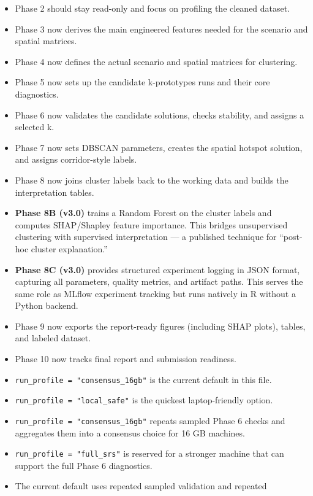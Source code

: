 \documentclass[
]{article}
\providecommand{\tightlist}{%
  \setlength{\itemsep}{0pt}\setlength{\parskip}{0pt}}
\begin{document}
\begin{itemize}
\tightlist
\item
  Phase 2 should stay read-only and focus on profiling the cleaned
  dataset.
\item
  Phase 3 now derives the main engineered features needed for the
  scenario and spatial matrices.
\item
  Phase 4 now defines the actual scenario and spatial matrices for
  clustering.
\item
  Phase 5 now sets up the candidate k-prototypes runs and their core
  diagnostics.
\item
  Phase 6 now validates the candidate solutions, checks stability, and
  assigns a selected k.
\item
  Phase 7 now sets DBSCAN parameters, creates the spatial hotspot
  solution, and assigns corridor-style labels.
\item
  Phase 8 now joins cluster labels back to the working data and builds
  the interpretation tables.
\item
  \textbf{Phase 8B (v3.0)} trains a Random Forest on the cluster labels
  and computes SHAP/Shapley feature importance. This bridges
  unsupervised clustering with supervised interpretation --- a published
  technique for ``post-hoc cluster explanation.''
\item
  \textbf{Phase 8C (v3.0)} provides structured experiment logging in
  JSON format, capturing all parameters, quality metrics, and artifact
  paths. This serves the same role as MLflow experiment tracking but
  runs natively in R without a Python backend.
\item
  Phase 9 now exports the report-ready figures (including SHAP plots),
  tables, and labeled dataset.
\item
  Phase 10 now tracks final report and submission readiness.
\item
  \texttt{run\_profile\ =\ "consensus\_16gb"} is the current default in
  this file.
\item
  \texttt{run\_profile\ =\ "local\_safe"} is the quickest
  laptop-friendly option.
\item
  \texttt{run\_profile\ =\ "consensus\_16gb"} repeats sampled Phase 6
  checks and aggregates them into a consensus choice for 16 GB machines.
\item
  \texttt{run\_profile\ =\ "full\_srs"} is reserved for a stronger
  machine that can support the full Phase 6 diagnostics.
\item
  The current default uses repeated sampled validation and repeated

\end{itemize}
\end{document}
